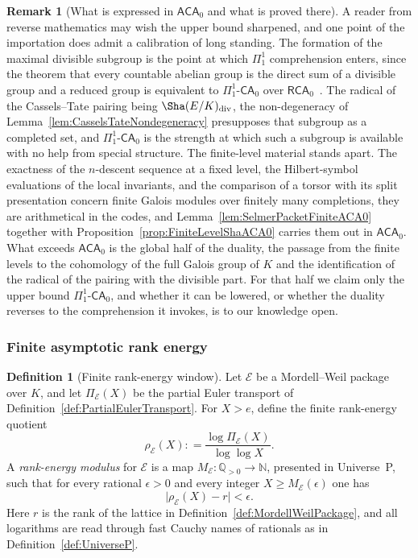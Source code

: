 \documentclass[10pt, reqno]{amsart}
\theoremstyle{plain}
\theoremstyle{definition}
\newtheorem{definition}[theorem]{Definition}
\newtheorem{remark}[theorem]{Remark}
\theoremstyle{plain}
\newcommand{\Q}{\mathbb{Q}}
\newcommand{\coloneqq}{\mathrel{\mathop:}=}
\begin{document}
\begin{remark}[What is expressed in $\mathsf{ACA}_{0}$ and what is proved there]
A reader from reverse mathematics may wish the upper bound sharpened, and one point of the importation does admit a calibration of long standing. The formation of the maximal divisible subgroup is the point at which $\Pi^{1}_{1}$ comprehension enters, since the theorem that every countable abelian group is the direct sum of a divisible group and a reduced group is equivalent to $\Pi^{1}_{1}\text{-}\mathsf{CA}_{0}$ over $\mathsf{RCA}_{0}$~\cite{FriedmanSimpsonSmith1983,simpson2009subsystems}. The radical of the Cassels--Tate pairing being $\Sha(E/K)_{\mathrm{div}}$, the non-degeneracy of Lemma~\ref{lem:CasselsTateNondegeneracy} presupposes that subgroup as a completed set, and $\Pi^{1}_{1}\text{-}\mathsf{CA}_{0}$ is the strength at which such a subgroup is available with no help from special structure. The finite-level material stands apart. The exactness of the $n$-descent sequence at a fixed level, the Hilbert-symbol evaluations of the local invariants, and the comparison of a torsor with its split presentation concern finite Galois modules over finitely many completions, they are arithmetical in the codes, and Lemma~\ref{lem:SelmerPacketFiniteACA0} together with Proposition~\ref{prop:FiniteLevelShaACA0} carries them out in $\mathsf{ACA}_{0}$. What exceeds $\mathsf{ACA}_{0}$ is the global half of the duality, the passage from the finite levels to the cohomology of the full Galois group of $K$ and the identification of the radical of the pairing with the divisible part. For that half we claim only the upper bound $\Pi^{1}_{1}\text{-}\mathsf{CA}_{0}$, and whether it can be lowered, or whether the duality reverses to the comprehension it invokes, is to our knowledge open.
\end{remark}

\subsubsection{Finite asymptotic rank energy}
\label{subsubsec:FiniteAsymptoticRankEnergy}

\begin{definition}[Finite rank-energy window]
\label{def:FiniteRankEnergyWindow}
Let $\mathcal{E}$ be a Mordell--Weil package over $K$, and let $\Pi_{\mathcal{E}}(X)$ be the partial Euler transport of Definition~\ref{def:PartialEulerTransport}. For $X>e$, define the finite rank-energy quotient
\[
  \rho_{\mathcal{E}}(X)
  \coloneqq
  \frac{\log \Pi_{\mathcal{E}}(X)}{\log\log X}.
\]
A \emph{rank-energy modulus} for $\mathcal{E}$ is a map $M_{\mathcal{E}} \colon \Q_{>0}\to \mathbb{N}$, presented in Universe~P, such that for every rational $\epsilon>0$ and every integer $X\ge M_{\mathcal{E}}(\epsilon)$ one has
\[
  \bigl|\rho_{\mathcal{E}}(X)-r\bigr| < \epsilon.
\]
Here $r$ is the rank of the lattice in Definition~\ref{def:MordellWeilPackage}, and all logarithms are read through fast Cauchy names of rationals as in Definition~\ref{def:UniverseP}.
\end{definition}
\end{document}
